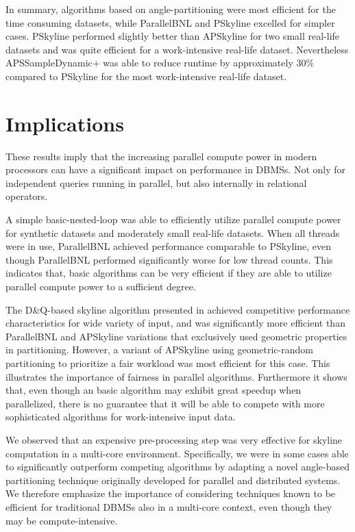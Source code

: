 \documentclass[12pt,a4paper,twoside]{report}
\begin{document}
In summary, algorithms based on angle-partitioning were most efficient
for the time consuming datasets, while ParallelBNL and PSkyline
excelled for simpler cases. PSkyline performed slightly better
than APSkyline for two small real-life datasets and was quite
efficient for a work-intensive real-life dataset. Nevertheless
APSSampleDynamic+ was able to reduce runtime by approximately 30\%
compared to PSkyline for the most work-intensive real-life
dataset.

\section{Implications}

These results imply that the increasing parallel compute power in
modern processors can have a significant impact on performance in
DBMSs. Not only for independent queries running in parallel, but also
internally in relational operators.

A simple basic-nested-loop \cite{selke2010highly} was able to
efficiently utilize parallel compute power for synthetic datasets and
moderately small real-life datasets. When all threads were in use,
ParallelBNL achieved performance comparable to PSkyline, even though
ParallelBNL performed significantly worse for low thread counts. This
indicates that, basic algorithms can be very efficient if they are
able to utilize parallel compute power to a sufficient degree.

The D\&Q-based skyline algorithm presented in \cite{park2009parallel}
achieved competitive performance characteristics for wide variety of
input, and was significantly more efficient than ParallelBNL and
APSkyline variations that exclusively used geometric properties in
partitioning. However, a variant of APSkyline using geometric-random
partitioning to prioritize a fair workload was most efficient for this
case. This illustrates the importance of fairness in parallel
algorithms. Furthermore it shows that, even though an basic algorithm
may exhibit great speedup when parallelized, there is no guarantee
that it will be able to compete with more sophisticated algorithms for
work-intensive input data.

We observed that an expensive pre-processing step was very effective
for skyline computation in a multi-core environment. Specifically, we
were in some cases able to significantly outperform competing
algorithms by adapting a novel angle-based partitioning technique
originally developed for parallel and distributed systems. We
therefore emphasize the importance of considering techniques known
to be efficient for traditional DBMSs also in a multi-core
context, even though they may be compute-intensive.
\end{document}
